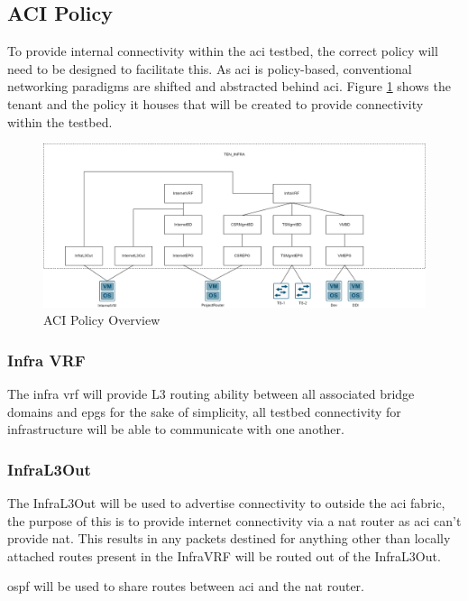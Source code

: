 \subsection{ACI Policy}
\label{design:Testbed:network-design:aci-policy}
To provide internal connectivity within the \gls{aci} testbed, the correct policy will need to be designed to facilitate this. As \gls{aci} is policy-based, conventional networking paradigms are shifted and abstracted behind \gls{aci}. Figure \ref{fig:epg-topology} shows the tenant and the policy it houses that will be created to provide connectivity within the testbed.

\begin{figure}[H]
    \centering
    \includegraphics[scale=0.17]{images/epg-topology.png}
    \caption{ACI Policy Overview}
    \label{fig:epg-topology}
\end{figure}

\subsubsection{Infra VRF}
The infra \gls{vrf} will provide L3 routing ability between all associated bridge domains and \gls{epg}s for the sake of simplicity, all testbed connectivity for infrastructure will be able to communicate with one another.

\subsubsection{InfraL3Out}
The InfraL3Out will be used to advertise connectivity to outside the \gls{aci} fabric, the purpose of this is to provide internet connectivity via a \gls{nat} router as \gls{aci} can't provide \gls{nat}. This results in any packets destined for anything other than locally attached routes present in the InfraVRF will be routed out of the InfraL3Out.

\gls{ospf} will be used to share routes between \gls{aci} and the \gls{nat} router.

